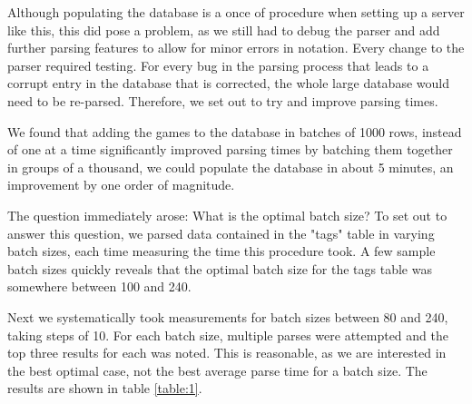 \documentclass{article}
\begin{document}
Although populating the database is a once
of procedure when setting up a server like this, this did pose a problem,
as we still had to debug the parser and add further parsing features to
allow for minor errors in notation. Every change to the parser required
testing.  For every bug in the parsing process that leads to a corrupt
entry in the database that is corrected, the whole large database would
need to be re-parsed.  Therefore, we set out to try and improve parsing
times.

We found that adding the games to the database in batches of 1000 rows, instead
of one at a time significantly improved parsing times by batching them
together in groups of a thousand, we could populate the database in about 5
minutes, an improvement by one order of magnitude.

The question immediately arose:  What is the optimal batch size? To set out
to answer this question, we parsed data contained in the "tags" table in
varying batch sizes, each time measuring the time this procedure took.  A
few sample batch sizes quickly reveals that the optimal batch size for the
tags table was somewhere between 100 and 240.

Next we systematically took measurements for batch sizes between 80 and
240, taking steps of 10.  For each batch size, multiple parses were
attempted and the top three results for each was noted. This is reasonable,
as we are interested in the best optimal case, not the best average parse
time for a batch size.  The results are shown in table \ref{table:1}.
\end{document}
